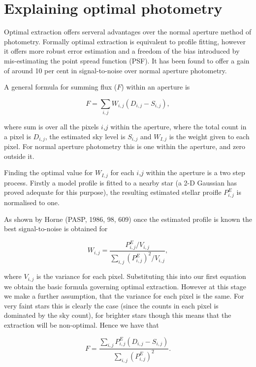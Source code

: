 \documentclass[twoside,11pt]{article}
\newcommand{\htmladdnormallink}[2]{#1}
\newcommand{\xlabel}[1]{}
\renewcommand{\_}{\texttt{\symbol{95}}}
\begin{document}
\section{\xlabel{Explaining_optimal_photometry}Explaining \xlabel{explaining}\label{explaining}optimal photometry}

Optimal extraction offers serveral advantages over the normal aperture
method of photometry. Formally optimal extraction is equivalent to profile
fitting, however it offers more robust error estimation and a freedom of
the bias introduced by mis-estimating the point spread function (PSF). It has been found to offer a gain of around 10 per cent in signal-to-noise over normal aperture photometry.

A general formula for summing flux ($F$) within an aperture is

\[F=\sum_{i,j}W_{i,j}(D_{i,j}-S_{i,j}),\]

where sum is over all the pixels $i$,$j$ within the aperture, where the total
count in a pixel is $D_{i,j}$, the estimated sky level is $S_{i,j}$ and $W_{I,j}$ is the weight given to each pixel. For normal aperture photometry
this is one within the aperture, and zero outside it.

Finding the optimal value for $W_{I,j}$ for each $i$,$j$ within the aperture is a two step process. Firstly a model profile is fitted to a nearby star (a 2-D Gaussian has proved adequate for this purpose), the resulting estimated stellar proifle $P_{i,j}^{E}$ is normalised to one.

As shown by Horne (\htmladdnormallink{PASP, 1986, 98, 609}{http://cdsads.u-strasbg.fr/cgi-bin/nph-bib_query?bibcode=1986PASP...98..609H&db_key=AST&nosetcookie=1&high=375ea70ad608221}) once the estimated profile is known the best signal-to-noise is obtained for

\[W_{i,j}=\frac{P_{i,j}^{E}/V_{i,j}}{\sum_{i,j}(P_{i,j}^{E})^2/V_{i,j}},\]

where $V_{i,j}$ is the variance for each pixel. Substituting this into our
first equation we obtain the basic formula governing optimal extraction. However at this stage we make a further assumption, that the variance for each pixel is the same. For very faint stars this is clearly the case (since the counts in each pixel is dominated by the sky count), for brighter stars though this means that the extraction will be non-optimal. Hence we have that

\[F=\frac{\sum_{i,j}P_{i,j}^{E}(D_{i,j}-S_{i,j})}{\sum_{i,j}(P_{i,j}^{E})^2}.\]
\end{document}

